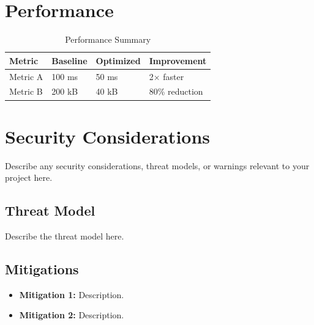 \documentclass[11pt,a4paper]{article}
\begin{document}
\newpage

\section{Performance}

\begin{table}[H]
    \centering
    \begin{tabular}{@{}llll@{}}
        \toprule
        \textbf{Metric} & \textbf{Baseline} & \textbf{Optimized} & \textbf{Improvement} \\
        \midrule
        Metric A & 100 ms & 50 ms  & 2$\times$ faster \\
        Metric B & 200 kB & 40 kB  & 80\% reduction \\
        \bottomrule
    \end{tabular}
    \caption{Performance Summary}
\end{table}

\newpage

\section{Security Considerations}

\begin{alertbox}
    Describe any security considerations, threat models, or warnings relevant to your project here.
\end{alertbox}

\subsection{Threat Model}
Describe the threat model here.

\subsection{Mitigations}
\begin{itemize}[noitemsep]
    \item \textbf{Mitigation 1:} Description.
    \item \textbf{Mitigation 2:} Description.
\end{itemize}

\newpage
\end{document}
